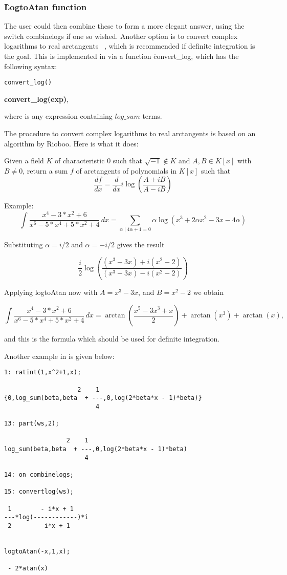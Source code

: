 \subsubsection{\f{LogtoAtan} function}
The user could then combine these to form a more elegant answer, using the switch combinelogs if one so wished. Another option is to convert complex logarithms to real arctangents ~\cite{Bronstein:97}, which is recommended if definite integration is the goal. This is implemented in \REDUCE via a function \f{convert\_log}, which has the following syntax:
\begin{syntax}
  \texttt{convert\_log()}
\end{syntax}
\begin{center} \textbf{convert\_log(exp)}, \end{center}
where  is any expression containing $log\_sum$ terms.

The procedure to convert complex logarithms to real arctangents is based on an algorithm by Rioboo. Here is what it does:

Given a field $K$ of characteristic 0 such that $\sqrt{-1} \not\in K$ and
$A, B \in K[x]$ with $B \not = 0$, return a sum $f$ of arctangents of polynomials in $K[x]$ such that
\[  \frac{df}{dx}=\frac{d}{dx} i \log(\frac{A+ i B}{A- i B}) \]

Example:
\[ \int \frac{x^4-3*x^2+6}{x^6-5*x^4+5*x^2+4} \, dx = \sum_{ \alpha \mid 4\alpha+1=0} \alpha \log(x^3+2\alpha x^2-3 x-4 \alpha) \]

Substituting $\alpha=i/2$ and $\alpha=-i/2$ gives the result

\[ \frac{i}{2} \log(\frac{(x^3-3 x)+i (x^2-2)}{(x^3-3 x)-i (x^2-2)}) \]

Applying logtoAtan now with $A=x^3-3 x$, and $B=x^2-2$ we obtain

\[ \int \frac{x^4-3*x^2+6}{x^6-5*x^4+5*x^2+4} \, dx = \arctan(\frac{x^5-3 x^3+x}{2})+\arctan(x^3)+\arctan(x) , \]

and this is the formula which should be used for definite integration.

Another example in \REDUCE is given below:
\begin{verbatim}
1: ratint(1,x^2+1,x);

                    2    1
{0,log_sum(beta,beta  + ---,0,log(2*beta*x - 1)*beta)}
                         4

13: part(ws,2);

                 2    1
log_sum(beta,beta  + ---,0,log(2*beta*x - 1)*beta)
                      4

14: on combinelogs;

15: convertlog(ws);

 1        - i*x + 1
---*log(------------)*i
 2         i*x + 1


logtoAtan(-x,1,x);

 - 2*atan(x)
\end{verbatim}

